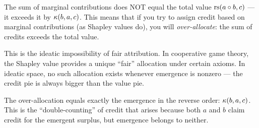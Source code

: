 \begin{paradox}
The sum of marginal contributions does NOT equal the total value $\operatorname{rs}(a \circ b, c)$ --- it exceeds it by $\kappa(b,a,c)$. This means that if you try to assign credit based on marginal contributions (as Shapley values do), you will \emph{over-allocate}: the sum of credits exceeds the total value.

This is the ideatic impossibility of fair attribution. In cooperative game theory, the Shapley value provides a unique ``fair'' allocation under certain axioms. In ideatic space, no such allocation exists whenever emergence is nonzero --- the credit pie is always bigger than the value pie.

The over-allocation equals exactly the emergence in the reverse order: $\kappa(b,a,c)$. This is the ``double-counting'' of credit that arises because both $a$ and $b$ claim credit for the emergent surplus, but emergence belongs to neither.
\end{paradox}
